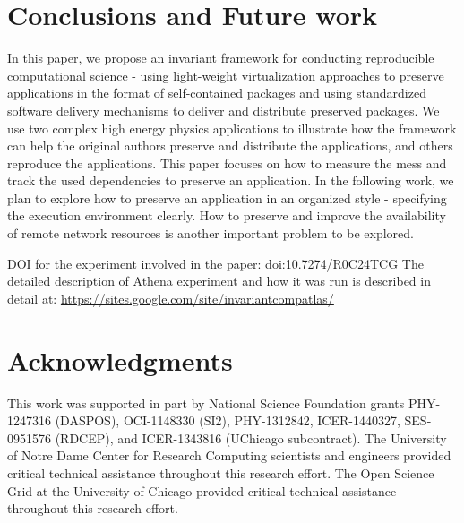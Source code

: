\documentclass[procedia]{easychair}
\begin{document}
\section{Conclusions and Future work}
In this paper, we propose an invariant framework for conducting reproducible computational science - using light-weight virtualization approaches to preserve applications in the format of self-contained packages and using standardized software delivery mechanisms to deliver and distribute preserved packages.
We use two complex high energy physics applications to illustrate how the framework can help the original authors preserve and distribute the applications, and others reproduce the applications.
This paper focuses on how to measure the mess and track the used dependencies to preserve an application.
In the following work, we plan to explore how to preserve an application in an organized style - specifying the execution environment clearly.
How to preserve and improve the availability of remote network resources is another important problem to be explored.

\small
\vspace{-10pt}
DOI for the experiment involved in the paper: \url{doi:10.7274/R0C24TCG}
The detailed description of Athena experiment and how it was run is described in detail at: \url{https://sites.google.com/site/invariantcompatlas/} 
\section*{Acknowledgments}

This work was supported in part by National Science Foundation grants PHY-1247316 (DASPOS), 
OCI-1148330 (SI2), PHY-1312842, ICER-1440327, SES-0951576 (RDCEP), and ICER-1343816 (UChicago subcontract).
The University of Notre Dame Center for Research Computing scientists and engineers provided critical technical assistance throughout this research effort.
The Open Science Grid at the University of Chicago provided critical technical assistance throughout this research effort.

\vspace{-10pt}


\end{document}
